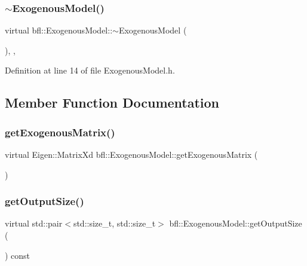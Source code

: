 \subsubsection{\texorpdfstring{$\sim$\+Exogenous\+Model()}{~ExogenousModel()}}
{\footnotesize\ttfamily virtual bfl\+::\+Exogenous\+Model\+::$\sim$\+Exogenous\+Model (\begin{DoxyParamCaption}{ }\end{DoxyParamCaption})\hspace{0.3cm}{\ttfamily [inline]}, {\ttfamily [virtual]}, {\ttfamily [noexcept]}}



Definition at line 14 of file Exogenous\+Model.\+h.



\subsection{Member Function Documentation}
\mbox{\label{classbfl_1_1ExogenousModel_a417f98b64e17a14af2d57e583cb119ea}} 
\subsubsection{\texorpdfstring{get\+Exogenous\+Matrix()}{getExogenousMatrix()}}
{\footnotesize\ttfamily virtual Eigen\+::\+Matrix\+Xd bfl\+::\+Exogenous\+Model\+::get\+Exogenous\+Matrix (\begin{DoxyParamCaption}{ }\end{DoxyParamCaption})\hspace{0.3cm}{\ttfamily [pure virtual]}}

\mbox{\label{classbfl_1_1ExogenousModel_a68fef857e5d251be2865eb6fd7642f1a}} 
\subsubsection{\texorpdfstring{get\+Output\+Size()}{getOutputSize()}}
{\footnotesize\ttfamily virtual std\+::pair$<$std\+::size\+\_\+t, std\+::size\+\_\+t$>$ bfl\+::\+Exogenous\+Model\+::get\+Output\+Size (\begin{DoxyParamCaption}{ }\end{DoxyParamCaption}) const\hspace{0.3cm}{\ttfamily [pure virtual]}}



